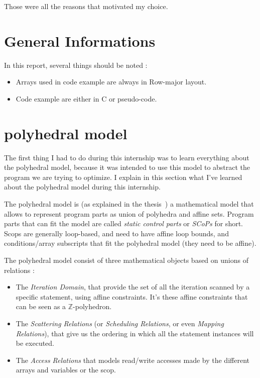 \documentclass[paper=a4, fontsize=11.5pt]{scrartcl}
\numberwithin{equation}{section}        %
\numberwithin{figure}{section}          %
\numberwithin{table}{section}               %
\begin{document}
\bigskip

Those were all the reasons that motivated my choice.


\section{General Informations}

    In this report, several things should be noted :
    \begin{itemize}
        \item Arrays used in code example are always in Row-major layout.
        \item Code example are either in C or pseudo-code.
    \end{itemize}

\section{polyhedral model}
The first thing I had to do during this internship was to learn everything about the polyhedral
model, because it was intended to use this model to abstract the program we are trying
to optimize. I explain in this section what I've learned about the polyhedral model during
this internship.

\bigskip

The polyhedral model is (as explained in the thesis~\cite{Bas'12}) a mathematical
model that allows to represent program parts as union of polyhedra and affine sets.
Program parts that can fit the model are called \textit{static control parts} or
\textit{SCoPs} for short. Scops are generally loop-based, and need to have affine loop bounds,
and conditions/array subscripts that fit the polyhedral model (they need to be affine).

The polyhedral model consist of three mathematical objects based on unions of relations :
\begin{itemize}
    \item The \textit{Iteration Domain}, that provide the set of all the iteration scanned
        by a specific statement, using affine constraints. It's these affine constraints 
        that can be seen as a $\mathbb{Z}$-polyhedron.
    \item The \textit{Scattering Relations} (or \textit{Scheduling Relations},
        or even \textit{Mapping Relations}), that give us the ordering in which
        all the statement instances will be executed.
    \item The \textit{Access Relations} that models read/write accesses made by
        the different arrays and variables or the scop.
\end{itemize}
\end{document}
